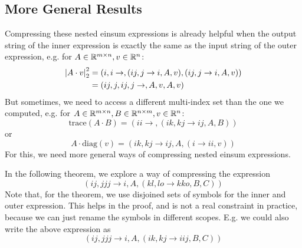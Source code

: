 \subsection{More General Results}

Compressing these nested einsum expressions is already helpful when the output string of the inner expression is exactly the same as the input string of the outer expression,
e.g. for $A \in \mathbb{R}^{m \times n}, v \in \mathbb{R}^{n}$:
\begin{align*}
    \left| A \cdot v \right|_2^2 & = (i,i\rightarrow,(ij, j \rightarrow i, A, v),(ij, j \rightarrow i, A, v)) \\
                        & = (ij,j,ij,j\rightarrow,A,v,A,v)
\end{align*}
But sometimes, we need to access a different multi-index set than the one we computed, e.g. for $A \in \mathbb{R}^{m \times n}, B \in \mathbb{R}^{n \times m}, v \in \mathbb{R}^{n}$:
$$\text{trace}(A \cdot B) = (ii \rightarrow, (ik, kj \rightarrow ij, A, B))$$
or
$$A \cdot \text{diag}(v) = (ik, kj \rightarrow ij, A, (i \rightarrow ii, v))$$
For this, we need more general ways of compressing nested einsum expressions.

In the following theorem, we explore a way of compressing the expression
$$(ij, jjj \rightarrow i, A, (kl, lo \rightarrow kko, B, C))$$
Note that, for the theorem, we use disjoined sets of symbols for the inner and outer expression.
This helps in the proof, and is not a real constraint in practice,
because we can just rename the symbols in different scopes.
E.g. we could also write the above expression as
$$(ij, jjj \rightarrow i, A, (ik, kj \rightarrow iij, B, C))$$

